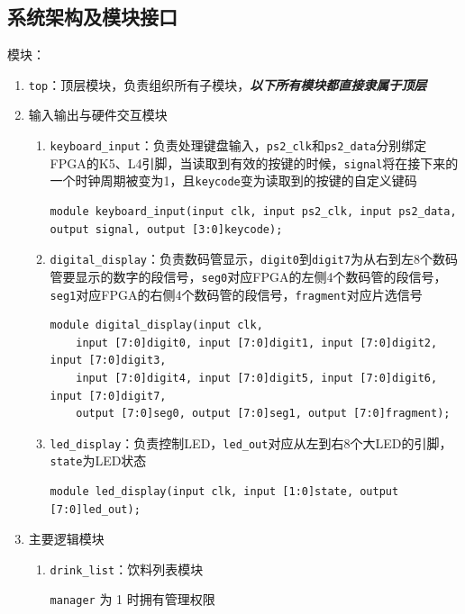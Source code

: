 \documentclass{article}
\begin{document}
\subsection{系统架构及模块接口}
模块：
\begin{enumerate}
	\item \texttt{top}：顶层模块，负责组织所有子模块，{\Large\textbf{\textit{以下所有模块都直接隶属于顶层}}}
	
	\item 输入输出与硬件交互模块
	\begin{enumerate}
	
		\item \texttt{keyboard\_input}：负责处理键盘输入，\texttt{ps2\_clk}和\texttt{ps2\_data}分别绑定FPGA的K5、L4引脚，当读取到有效的按键的时候，\texttt{signal}将在接下来的一个时钟周期被变为1，且\texttt{keycode}变为读取到的按键的自定义键码
			\begin{verbatim}
module keyboard_input(input clk, input ps2_clk, input ps2_data, output signal, output [3:0]keycode);
			\end{verbatim}
			
		\item \texttt{digital\_display}：负责数码管显示，\texttt{digit0}到\texttt{digit7}为从右到左8个数码管要显示的数字的段信号，\texttt{seg0}对应FPGA的左侧4个数码管的段信号，\texttt{seg1}对应FPGA的右侧4个数码管的段信号，\texttt{fragment}对应片选信号
			\begin{verbatim}
module digital_display(input clk,
	input [7:0]digit0, input [7:0]digit1, input [7:0]digit2, input [7:0]digit3,
	input [7:0]digit4, input [7:0]digit5, input [7:0]digit6, input [7:0]digit7,
	output [7:0]seg0, output [7:0]seg1, output [7:0]fragment);
			\end{verbatim}
		
		\item \texttt{led\_display}：负责控制LED，\texttt{led\_out}对应从左到右8个大LED的引脚，\texttt{state}为LED状态
		\begin{verbatim}
module led_display(input clk, input [1:0]state, output [7:0]led_out);
		\end{verbatim}
	\end{enumerate}
	
	\item 主要逻辑模块
	\begin{enumerate}
		\item \texttt{drink\_list}：饮料列表模块
			
			\texttt{manager} 为 1 时拥有管理权限
			

\end{enumerate}
\end{enumerate}
\end{document}
